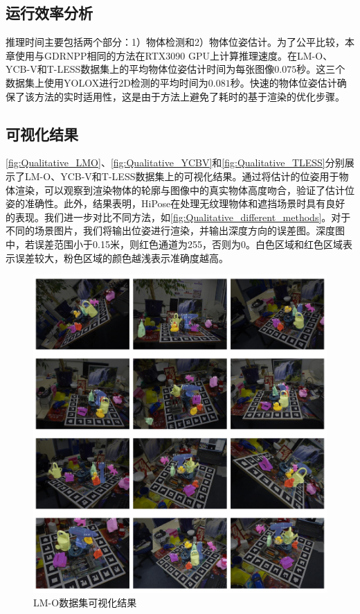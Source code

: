 \subsection{运行效率分析}

推理时间主要包括两个部分：1）物体检测和2）物体位姿估计。为了公平比较，本章使用与GDRNPP相同的方法在RTX3090 GPU上计算推理速度。在LM-O、YCB-V和T-LESS数据集上的平均物体位姿估计时间为每张图像$0.075$秒。这三个数据集上使用YOLOX\cite{Ge2021YOLOXEY}进行2D检测的平均时间为$0.081$秒。快速的物体位姿估计确保了该方法的实时适用性，这是由于方法上避免了耗时的基于渲染的优化步骤。

\subsection{可视化结果}
\autoref{fig:Qualitative_LMO}、\autoref{fig:Qualitative_YCBV}和\autoref{fig:Qualitative_TLESS}分别展示了LM-O\cite{Brachmann2016UncertaintyDriven6P}、YCB-V\cite{ycbv}和T-LESS\cite{tless}数据集上的可视化结果。通过将估计的位姿用于物体渲染，可以观察到渲染物体的轮廓与图像中的真实物体高度吻合，验证了估计位姿的准确性。此外，结果表明，HiPose在处理无纹理物体和遮挡场景时具有良好的表现。我们进一步对比不同方法，如\autoref{fig:Qualitative_different_methods}。对于不同的场景图片，我们将输出位姿进行渲染，并输出深度方向的误差图。深度图中，若误差范围小于0.15米，则红色通道为255，否则为0。白色区域和红色区域表示误差较大，粉色区域的颜色越浅表示准确度越高。

\begin{figure}
    \centering
    \includegraphics[width=1\linewidth]{figure/hipose/lmo_visulize.pdf}
    \caption{LM-O数据集可视化结果}
    \label{fig:Qualitative_LMO}
\end{figure}

